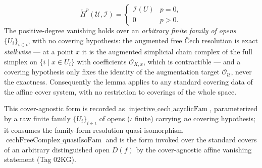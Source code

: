 \begin{lemma}
  \[
    \check{H}^p(\mathcal{U}, \mathcal{I}) =
    \begin{cases}
      \mathcal{I}(U) & p = 0, \\
      0 & p > 0.
    \end{cases}
  \]
  The positive-degree vanishing holds over an \emph{arbitrary finite family of opens}
  \(\{U_i\}_{i \in \iota}\), with no covering hypothesis: the augmented free {\v C}ech
  resolution is exact \emph{stalkwise} — at a point \(x\) it is the augmented simplicial
  chain complex of the full simplex on \(\{i \mid x \in U_i\}\) with coefficients
  \(\mathcal{O}_{X,x}\), which is contractible — and a covering hypothesis only fixes the
  identity of the augmentation target \(\mathcal{O}_\mathcal{U}\), never the exactness.
  Consequently the lemma applies to any standard covering data of the affine cover system,
  with no restriction to coverings of the whole space.

  This cover-agnostic form is recorded as \(\operatorname{injective\_cech\_acyclicFam}\),
  parameterized by a raw finite family \(\{U_i\}_{i \in \iota}\) of opens
  (\(\iota\) finite) carrying \emph{no} covering hypothesis; it consumes the family-form
  resolution quasi-isomorphism \(\operatorname{cechFreeComplex\_quasiIsoFam}\) and is the
  form invoked over the standard covers of an arbitrary distinguished open \(D(f)\) by the
  cover-agnostic affine vanishing statement (Tag 02KG).
\end{lemma}

